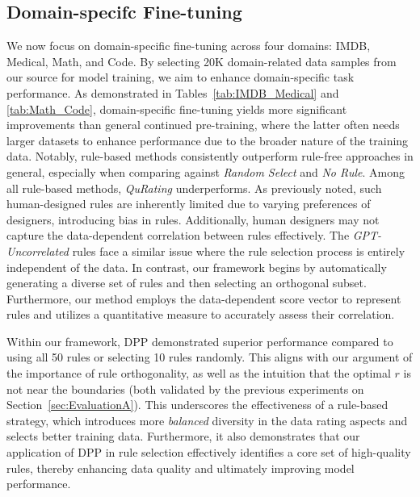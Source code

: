 \documentclass{article}
\begin{document}
\subsection{Domain-specifc Fine-tuning}\label{subsec:EvalB_domain_finetune}
We now focus on domain-specific fine-tuning across four domains: IMDB, Medical, Math, and Code. By selecting 20K domain-related data samples from our source for model training, we aim to enhance domain-specific task performance. As demonstrated in Tables~\ref{tab:IMDB_Medical} and \ref{tab:Math_Code}, domain-specific fine-tuning yields more significant improvements than general continued pre-training, where the latter often needs larger datasets to enhance performance due to the broader nature of the training data. Notably, rule-based methods consistently outperform rule-free approaches in general, especially when comparing against \textit{Random Select} and \textit{No Rule}. Among all rule-based methods, \textit{QuRating} underperforms. As previously noted, such human-designed rules are inherently limited due to varying preferences of designers, introducing bias in rules. Additionally, human designers may not capture the data-dependent correlation between rules effectively. The \textit{GPT-Uncorrelated} rules face a similar issue where the rule selection process is entirely independent of the data. In contrast, our framework begins by automatically generating a diverse set of rules and then selecting an orthogonal subset. Furthermore, our method employs the data-dependent score vector to represent rules and utilizes a quantitative measure to accurately assess their correlation.

Within our framework, DPP demonstrated superior performance compared to using all 50 rules or selecting 10 rules randomly. This aligns with our argument of the importance of rule orthogonality, as well as the intuition that the optimal $r$ is not near the boundaries (both validated by the previous experiments on Section~\ref{sec:EvaluationA}). This underscores the effectiveness of a rule-based strategy, which introduces more \textit{balanced} diversity in the data rating aspects and selects better training data. Furthermore, it also demonstrates that our application of DPP in rule selection effectively identifies a core set of high-quality rules, thereby enhancing data quality and ultimately improving model performance.
\end{document}
